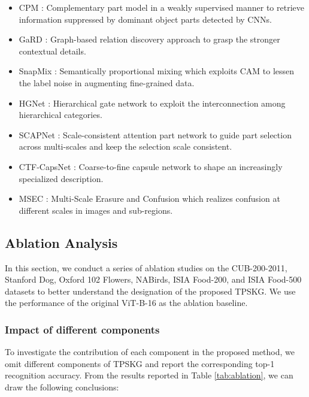 \documentclass[5p,twocolumn]{elsarticle}
\begin{document}
\begin{itemize}
\item {CPM   \cite{Ge2019Weakly}}: Complementary part model in a weakly supervised manner to retrieve information suppressed by dominant object parts detected by CNNs.

\item {GaRD \cite{Zhao_2021_CVPR}}: Graph-based relation discovery approach to grasp the stronger contextual details.

\item {SnapMix \cite{Huang2021SnapMix}}: Semantically proportional mixing which exploits CAM to lessen the label noise in augmenting fine-grained data.


\item {HGNet    \cite{CHEN2021}}:  Hierarchical gate network  to exploit the interconnection among hierarchical categories. 




\item {SCAPNet \cite{Liu2021Learning}}: Scale-consistent attention part network to guide part selection across multi-scales and keep the selection scale consistent.

\item {CTF-CapsNet \cite{Lin2021}}: Coarse-to-fine capsule network to shape an increasingly specialized description. 
\item {MSEC \cite{Zhang2021}}: Multi-Scale Erasure and Confusion which realizes confusion at different scales in images and sub-regions.


\end{itemize}




\subsection{Ablation Analysis}
In this section, we conduct a series of ablation studies on the CUB-200-2011, Stanford Dog, Oxford 102 Flowers, NABirds, ISIA Food-200, and ISIA Food-500 datasets to better understand the designation of the proposed TPSKG. We use the performance of the original ViT-B-16 as the ablation baseline.


\subsubsection{\textbf{Impact of different components}}
To investigate the contribution of each component in the proposed method, we omit different components of TPSKG and report the corresponding top-1 recognition accuracy. From the results reported in Table \ref{tab:ablation}, we can draw the following conclusions: 
\end{document}
